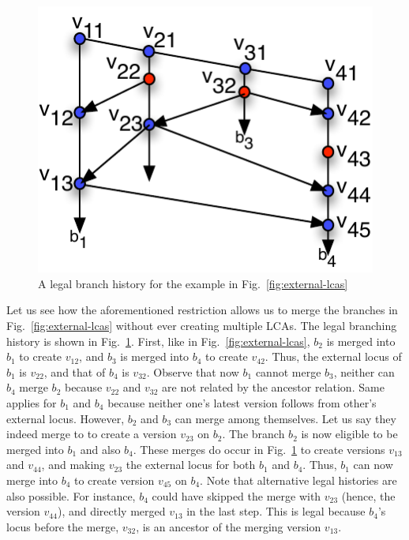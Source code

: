 

\begin{figure}
\centering
\includegraphics[scale=0.75]{Figures/legal-merge}

\caption{A legal branch history for the example in
Fig.~\ref{fig:external-lcas}}
\label{fig:legal-merge}
\end{figure}


Let us see how the aforementioned restriction allows us to merge the
branches in Fig.~\ref{fig:external-lcas} without ever creating
multiple LCAs. The legal branching history is shown in
Fig.~\ref{fig:legal-merge}. First, like in
Fig.~\ref{fig:external-lcas}, $b_2$ is merged into $b_1$ to create
$v_{12}$, and $b_3$ is merged into $b_4$ to create $v_{42}$. Thus, the
external locus of $b_1$ is $v_{22}$, and that of $b_4$ is $v_{32}$.
Observe that now $b_1$ cannot merge $b_3$, neither can $b_4$ merge
$b_2$ because $v_{22}$ and $v_{32}$ are not related by the ancestor
relation. Same applies for $b_1$ and $b_4$ because neither one's
latest version follows from other's external locus.  However, $b_2$
and $b_3$ can merge among themselves. Let us say they indeed merge to
to create a version $v_{23}$ on $b_2$. The branch $b_2$ is now
eligible to be merged into $b_1$ and also $b_4$. These merges do occur
in Fig.~\ref{fig:legal-merge} to create versions $v_{13}$ and
$v_{44}$, and making $v_{23}$ the external locus for both $b_1$ and
$b_4$. Thus, $b_1$ can now merge into $b_4$ to create version $v_{45}$
on $b_4$. Note that alternative legal histories are also possible. For
instance, $b_4$ could have skipped the merge with $v_{23}$ (hence, the
version $v_{44}$), and directly merged $v_{13}$ in the last step.
This is legal because $b_4$'s locus before the merge, $v_32$, is an
ancestor of the merging version $v_{13}$.


